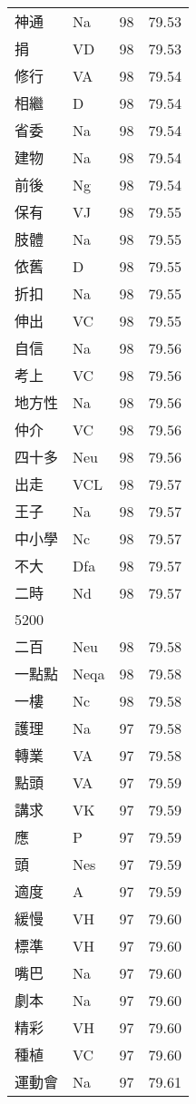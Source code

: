 \documentclass[twocolumn]{book}
\begin{document}
\begin{supertabular}{llrr}
神通 & Na & 98 &  79.53\\
捐 & VD & 98 &  79.53\\
修行 & VA & 98 &  79.54\\
相繼 & D & 98 &  79.54\\
省委 & Na & 98 &  79.54\\
建物 & Na & 98 &  79.54\\
前後 & Ng & 98 &  79.54\\
保有 & VJ & 98 &  79.55\\
肢體 & Na & 98 &  79.55\\
依舊 & D & 98 &  79.55\\
折扣 & Na & 98 &  79.55\\
伸出 & VC & 98 &  79.55\\
自信 & Na & 98 &  79.56\\
考上 & VC & 98 &  79.56\\
地方性 & Na & 98 &  79.56\\
仲介 & VC & 98 &  79.56\\
四十多 & Neu & 98 &  79.56\\
出走 & VCL & 98 &  79.57\\
王子 & Na & 98 &  79.57\\
中小學 & Nc & 98 &  79.57\\
不大 & Dfa & 98 &  79.57\\
二時 & Nd & 98 &  79.57\\
5200\\
二百 & Neu & 98 &  79.58\\
一點點 & Neqa & 98 &  79.58\\
一樓 & Nc & 98 &  79.58\\
護理 & Na & 97 &  79.58\\
轉業 & VA & 97 &  79.58\\
點頭 & VA & 97 &  79.59\\
講求 & VK & 97 &  79.59\\
應 & P & 97 &  79.59\\
頭 & Nes & 97 &  79.59\\
適度 & A & 97 &  79.59\\
緩慢 & VH & 97 &  79.60\\
標準 & VH & 97 &  79.60\\
嘴巴 & Na & 97 &  79.60\\
劇本 & Na & 97 &  79.60\\
精彩 & VH & 97 &  79.60\\
種植 & VC & 97 &  79.60\\
運動會 & Na & 97 &  79.61\\

\end{supertabular}
\end{document}
